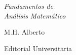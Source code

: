 \begingroup
\thispagestyle{empty}
\begin{center}
\vspace*{1.6in}
{\Large\itshape Fundamentos de\\[2pt] Análisis Matemático\par}
\vspace{0.6in}
{\normalsize M.H. Alberto\par}
\vfill
{\small Editorial Universitaria\par}
\vspace{0.3in}
\end{center}
\endgroup
\clearpage

\thispagestyle{empty}\mbox{}\clearpage
